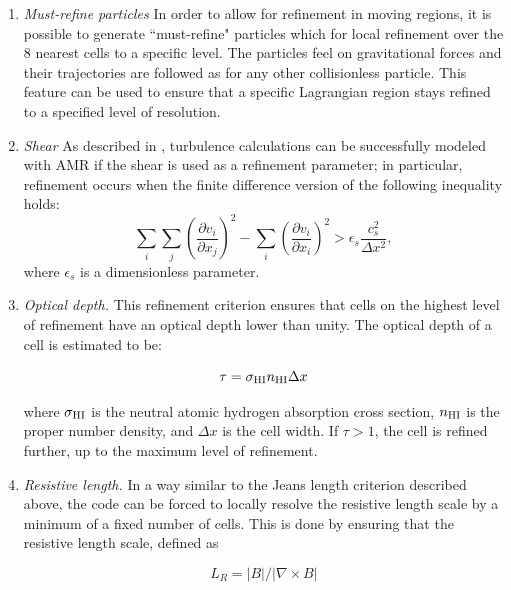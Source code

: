 \begin{enumerate}
\item{\em Must-refine particles}  In order to allow for refinement in moving regions, it is possible to generate ``must-refine" particles which for local refinement over the 8 nearest cells to a specific level.  The particles feel on gravitational forces and their trajectories are followed as for any other collisionless particle.  This feature can be used to ensure that a specific Lagrangian region stays refined to a specified level of resolution. 

\item{\em Shear} As described in \citet{Kritsuk06}, turbulence calculations can be successfully modeled with AMR if the shear is used as a refinement parameter; in particular, refinement occurs when the finite difference version of the following inequality holds:
\begin{equation}
\sum_i \sum_j \left( \frac{\partial v_i}{\partial x_j} \right)^2 -  \sum_i \left( \frac{\partial v_i}{\partial x_i} \right)^2
> \epsilon_s \frac{c_s^2}{\Delta x^2},
\end{equation}
where $\epsilon_s$ is a dimensionless parameter.

\item{\em Optical depth.} This refinement criterion ensures that cells on the highest level of refinement have an  optical depth lower than unity.  The optical depth of a cell is estimated to be:

\begin{equation}
\tau = \sigma_{\rm HI} n_{\rm HI} \Delta x 
\end{equation}

where $\sigma_{\rm HI}$ is the neutral atomic hydrogen absorption
cross section, $n_{\rm HI}$ is the proper  number density,
and $\Delta x$ is the cell width.  If $\tau > 1$, the cell is refined
further, up to the maximum level of refinement.

\item{\em Resistive length.}  In a way similar to the Jeans length criterion described above, the code can be forced to locally resolve the resistive length scale by a minimum of a fixed number of cells.  This is done by ensuring that the resistive length scale, defined as

\begin{equation}
L_R = |B| / |\nabla \times B|
\end{equation}


\end{enumerate}
